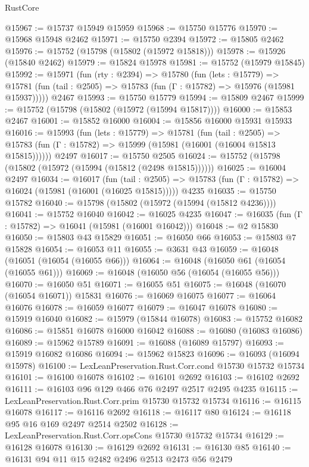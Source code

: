 \begin{lexlean}{RustCore}
\begin{coremodule}
@15967 := @15737 @15949 @15959
@15968 := @15750 @15776
@15970 := @15968 @15948 @2462
@15971 := @15750 @2394
@15972 := @15805 @2462
@15976 := @15752 (@15798 (@15802 (@15972 @15818)))
@15978 := @15926 (@15840 @2462)
@15979 := @15824 @15978
@15981 := @15752 (@15979 @15845)
@15992 := @15971
    (fun (rty : @2394) =>
    @15780
      (fun (lets : @15779) =>
      @15781 (fun (tail : @2505) => @15783 (fun (Γ : @15782) => @15976 (@15981 @15937)))))
    @2467
@15993 := @15750 @15779
@15994 := @15809 @2467
@15999 := @15752 (@15798 (@15802 (@15972 (@15994 @15817))))
@16000 := @15853 @2467
@16001 := @15852 @16000
@16004 := @15856 @16000 @15931 @15933
@16016 := @15993
    (fun (lets : @15779) =>
    @15781
      (fun (tail : @2505) =>
      @15783 (fun (Γ : @15782) => @15999 (@15981 (@16001 (@16004 @15813 @15815))))))
    @2497
@16017 := @15750 @2505
@16024 := @15752 (@15798 (@15802 (@15972 (@15994 (@15812 (@2498 @15815))))))
@16025 := @16004 @2497
@16034 := @16017
    (fun (tail : @2505) => @15783 (fun (Γ : @15782) => @16024 (@15981 (@16001 (@16025 @15815)))))
    @4235
@16035 := @15750 @15782
@16040 := @15798 (@15802 (@15972 (@15994 (@15812 @4236))))
@16041 := @15752 @16040
@16042 := @16025 @4235
@16047 := @16035 (fun (Γ : @15782) => @16041 (@15981 (@16001 @16042)))
@16048 := @2 @15830
@16050 := @15803 @43 @15829
@16051 := @16050 @66
@16053 := @15803 @7 @15828
@16054 := @16053 @11
@16055 := @3631 @43
@16059 := @16048 (@16051 (@16054 (@16055 @66)))
@16064 := @16048 (@16050 @61 (@16054 (@16055 @61)))
@16069 := @16048 (@16050 @56 (@16054 (@16055 @56)))
@16070 := @16050 @51
@16071 := @16055 @51
@16075 := @16048 (@16070 (@16054 @16071)) @15831
@16076 := @16069 @16075
@16077 := @16064 @16076
@16078 := @16059 @16077
@16079 := @16047 @16078
@16080 := @15919 @16040
@16082 := @15979 (@15844 @16078)
@16083 := @15752 @16082
@16086 := @15851 @16078 @16000 @16042
@16088 := @16080 (@16083 @16086)
@16089 := @15962 @15789
@16091 := @16088 (@16089 @15797)
@16093 := @15919 @16082 @16086
@16094 := @15962 @15823
@16096 := @16093 (@16094 @15978)
@16100 := LexLeanPreservation.Rust.Corr.cond @15730 @15732 @15734
@16101 := @16100 @16078
@16102 := @16101 @2692
@16103 := @16102 @2692
@16111 := @16103 @96 @129 @466 @76 @2497 @2517 @2495 @4235
@16115 := LexLeanPreservation.Rust.Corr.prim @15730 @15732 @15734
@16116 := @16115 @16078
@16117 := @16116 @2692
@16118 := @16117 @80
@16124 := @16118 @95 @16 @169 @2497 @2514 @2502
@16128 := LexLeanPreservation.Rust.Corr.opsCons @15730 @15732 @15734
@16129 := @16128 @16078
@16130 := @16129 @2692
@16131 := @16130 @85
@16140 := @16131 @94 @11 @15 @2482 @2496 @2513 @2473 @56 @2479

\end{coremodule}
\end{lexlean}
